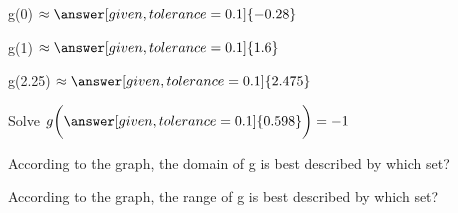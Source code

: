 \documentclass{ximera}
\begin{document}
\begin{exercise}
g(0)   $\approx \answer[given,tolerance=0.1]{-0.28}$
\end{exercise}


\begin{exercise}
g(1)   $\approx \answer[given,tolerance=0.1]{1.6}$
\end{exercise}


\begin{exercise}
g(2.25)   $\approx \answer[given,tolerance=0.1]{2.475}$
\end{exercise}



\begin{exercise}
Solve   $ g\bigg( \answer[given,tolerance=0.1]{0.598} \bigg) = -1$
\end{exercise}







\begin{exercise}
According to the graph, the domain of g is best described by which set?
\begin{multipleChoice}
\choice{$[4, 1) \cup (1, 4]$}
\choice{$(-4, 4]$}
\choice[correct]{$[-4, 4]$}
\end{multipleChoice}
\end{exercise}

\begin{exercise}
According to the graph, the range of g is best described by which set?
\begin{multipleChoice}
\choice{$[-1.4, 2.5)$}
\choice[correct]{$(-1.4, 2.5]$}
\choice{$[1, 1]$}
\end{multipleChoice}
\end{exercise}
\end{document}
